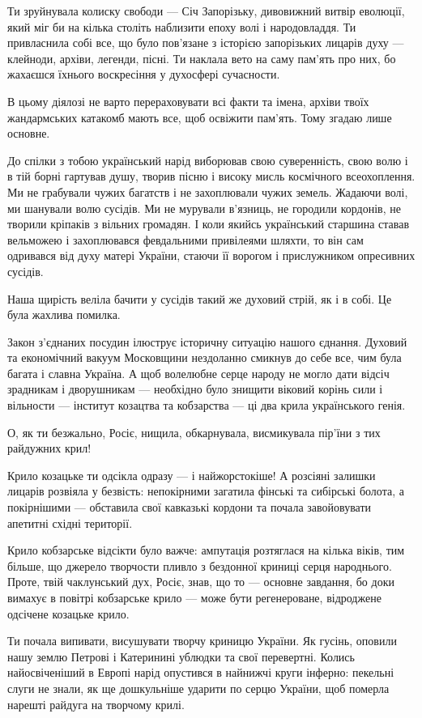 Ти зруйнувала колиску свободи — Січ Запорізьку, дивовижний витвір еволюції,
який міг би на кілька століть наблизити епоху волі і народовладдя. Ти
привласнила собі все, що було пов'язане з історією запорізьких лицарів духу —
клейноди, архіви, легенди, пісні. Ти наклала вето на саму пам'ять про них, бо
жахаєшся їхнього воскресіння у духосфері сучасности.

В цьому діялозі не варто перераховувати всі факти та імена, архіви твоїх
жандармських катакомб мають все, щоб освіжити пам'ять. Тому згадаю лише
основне.

До спілки з тобою український нарід виборював свою суверенність, свою волю і в
тій борні гартував душу, творив пісню і високу мисль космічного всеохоплення.
Ми не грабували чужих багатств і не захоплювали чужих земель. Жадаючи волі, ми
шанували волю сусідів. Ми не мурували в'язниць, не городили кордонів, не
творили кріпаків з вільних громадян. І коли якийсь український старшина ставав
вельможею і захоплювався февдальними привілеями шляхти, то він сам одривався
від духу матері України, стаючи її ворогом і прислужником опресивних сусідів.

Наша щирість веліла бачити у сусідів такий же духовий стрій, як і в собі. Це
була жахлива помилка.

Закон з'єднаних посудин ілюструє історичну ситуацію нашого єднання. Духовий та
економічний вакуум Московщини нездоланно смикнув до себе все, чим була багата і
славна Україна. А щоб волелюбне серце народу не могло дати відсіч зрадникам і
дворушникам — необхідно було знищити віковий корінь сили і вільности — інститут
козацтва та кобзарства — ці два крила українського генія.

О, як ти безжально, Росіє, нищила, обкарнувала, висмикувала пір'їни з тих
райдужних крил!

Крило козацьке ти одсікла одразу — і найжорстокіше! А розсіяні залишки лицарів
розвіяла у безвість: непокірними загатила фінські та сибірські болота, а
покірнішими — обставила свої кавказькі кордони та почала завойовувати апетитні
східні території.

Крило кобзарське відсікти було важче: ампутація розтяглася на кілька віків, тим
більше, що джерело творчости пливло з бездонної криниці серця народнього.
Проте, твій чаклунський дух, Росіє, знав, що то — основне завдання, бо доки
вимахує в повітрі кобзарське крило — може бути регенероване, відроджене
одсічене козацьке крило.

Ти почала випивати, висушувати творчу криницю України. Як гусінь, оповили нашу
землю Петрові і Катеринині ублюдки та свої перевертні. Колись найосвіченіший в
Европі нарід опустився в найнижчі круги інферно: пекельні слуги не знали, як ще
дошкульніше ударити по серцю України, щоб померла нарешті райдуга на творчому
крилі.

